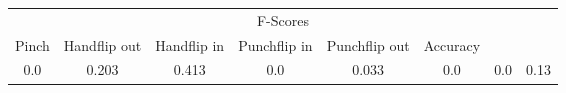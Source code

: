\documentclass{standalone}
\begin{document}
 
 \begin{tabular}{|c|c|c|c|c|c|c ||c|}
\cline{1-8}\multicolumn{8}{|c|}{F-Scores} \\ 
\cline{1-8}Pinch & Handflip out & Handflip in & Punchflip in & Punchflip out & Accuracy\\ 
\cline{1-8}0.0 & 0.203 & 0.413 & 0.0 & 0.033 & 0.0 & 0.0 & 0.13\\ 
 \cline{1-8}\hline \end{tabular}
 
\end{document}
